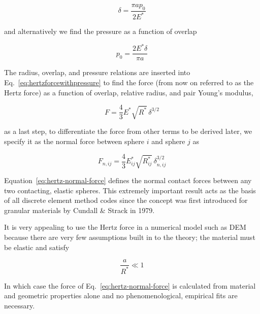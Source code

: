 \begin{equation}
	\delta = \frac{\pi a p_0}{2E^*}
\end{equation}

and alternatively we find the pressure as a function of overlap

\begin{equation}\label{eq:hertzian-pressure}
	p_0 = \frac{2E^*\delta}{\pi a}
\end{equation}

The radius, overlap, and pressure relations are inserted into Eq.~\ref{eq:hertzforcewithpressure} to find the force (from now on referred to as the Hertz force) as a function of overlap, relative radius, and pair Young's modulus,

\begin{equation}\label{eq:hertz-force}
	F = \frac{4}{3}E^* \sqrt{R^*} \, \delta^{3/2}
\end{equation}

as a last step, to differentiate the force from other terms to be derived later, we specify it as the normal force between sphere $i$ and sphere $j$ as

\begin{equation}\label{eq:hertz-normal-force}
	F_{n,ij} = \frac{4}{3}E_{ij}^* \sqrt{R_{ij}^*} \, \delta_{n,ij}^{3/2}
\end{equation}

Equation~\ref{eq:hertz-normal-force} defines the normal contact forces between any two contacting, elastic spheres. This extremely important result acts as the basis of all discrete element method codes since the concept was first introduced for granular materials by Cundall \& Strack in 1979\cite{Cundall1979}. 

It is very appealing to use the Hertz force in a numerical model such as DEM because there are very few assumptions built in to the theory; the material must be elastic and satisfy

\begin{equation}
	\frac{a}{R^*} \ll 1
\end{equation}

In which case the force of Eq.~\ref{eq:hertz-normal-force} is calculated from material and geometric properties alone and no phenomenological, empirical fits are necessary.



